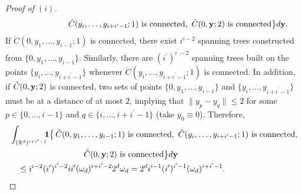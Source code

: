 \documentclass[11pt]{amsart}
\numberwithin{equation}{section}
\theoremstyle{plain}
\theoremstyle{definition}
\begin{document}
\begin{proof}[Proof of $(i)$]
\begin{align*}
&\qquad \qquad \qquad \quad \check{C}(y_i, \dots, y_{i+{i^{\prime}}-1}; 1) \text{ is connected}, \ \check{C}(0,{{\bf y}}; 2) \text{ is connected} \bigr\} d{{\bf y}}.
\end{align*}
If $\check{C}(0,y_1,\dots,y_{i-1}; 1)$ is connected, there exist $i^{i-2}$ spanning trees constructed from $\{ 0,y_1,\dots,y_{i-1} \}$. Similarly, there are $({i^{\prime}})^{{i^{\prime}} -2}$ spanning trees built on the points $\{ y_i, \dots, y_{i+{i^{\prime}}-1}\}$ whenever $\check{C}(y_i,\dots,y_{i+{i^{\prime}}-1}; 1)$ is connected. In addition, if $\check{C}(0,{{\bf y}}; 2)$ is connected, two sets of points $\{ 0,y_1,\dots,y_{i-1}\}$ and $\{ y_i,\dots,y_{i+{i^{\prime}}-1} \}$ must be at a distance of at most $2$, implying that $\| y_p - y_q \| \leq 2$ for some $p \in \{ 0,\dots,i-1 \}$ and $q\in \{ i,\dots,i+{i^{\prime}}-1 \}$ (take $y_0 \equiv 0$). Therefore,
\begin{align*}
&\int_{({{\mathbb R}}^d)^{i+{i^{\prime}}-1}} \hspace{-5pt} {{\bf 1}} \bigl\{ \, \check{C}(0,y_1,\dots,y_{i-1}; 1) \text{ is connected}, \ \check{C}(y_i, \dots, y_{i+{i^{\prime}}-1}; 1) \text{ is connected}, \\
&\quad \qquad \qquad \qquad \qquad  \check{C}(0,{{\bf y}}; 2) \text{ is connected} \bigr\} d{{\bf y}}  \\
&\quad \leq i^{i-2} ({i^{\prime}})^{{i^{\prime}}-2} i {i^{\prime}} (\omega_d)^{i+{i^{\prime}}-2} 2^d \omega_d = 2^d i^{i-1} ({i^{\prime}})^{{i^{\prime}}-1} (\omega_d)^{i+{i^{\prime}}-1}.
\end{align*}
\end{proof}
\end{document}
